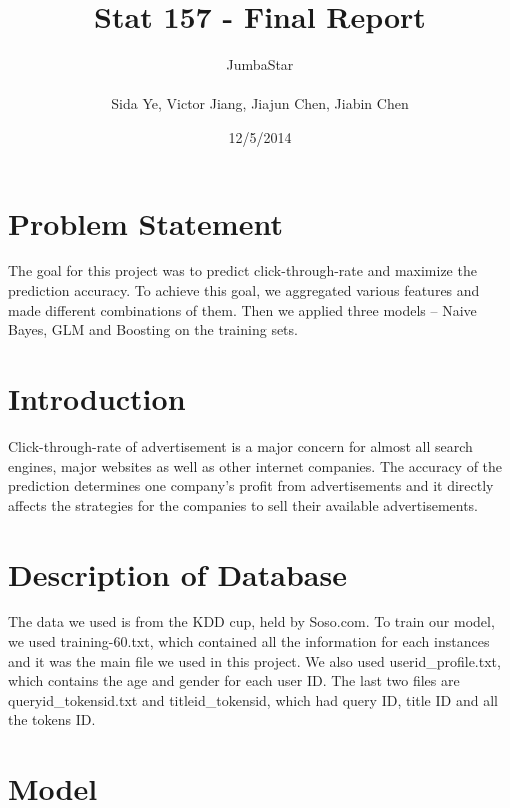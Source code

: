 \documentclass[12pt]{article}
\title{\LARGE \bf  Stat 157 - Final Report}
\author{ JumbaStar\\
\\ Sida Ye, Victor Jiang, Jiajun Chen, Jiabin Chen}
\date{\small 12/5/2014}
\begin{document}
\maketitle
{}


\section{Problem Statement}
The goal for this project was to predict click-through-rate and maximize the prediction accuracy. To achieve this goal, we aggregated various features and made different combinations of them. Then we applied three models -- Naive Bayes, GLM and Boosting on the training sets.



\section{Introduction}
\setlength{\parskip}{0 pt}
Click-through-rate of advertisement is a major concern for almost all search engines, major websites as well as other internet companies. The accuracy of the prediction determines one company’s profit from advertisements and it directly affects the strategies for the companies to sell their available advertisements. 






\section{Description of Database}
\setlength{\parskip}{0 pt}
The data we used is from the KDD cup, held by Soso.com. To train our model, we used training-60.txt, which contained all the information for each instances and it was the main file we used in this project. We also used userid\_profile.txt, which contains the age and gender for each user ID. The last two files are queryid\_tokensid.txt and titleid\_tokensid, which had query ID, title ID and all the tokens ID. 




\section{Model}
\end{document}
